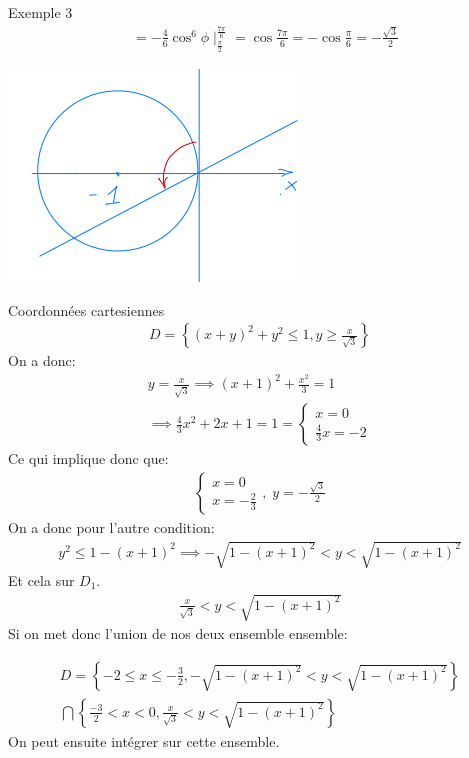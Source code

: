 \begin{parag}{Exemple 3}
\begin{align*}
                       &= - \frac{4}{6}\cos^6 \phi \mid_{\frac{\pi}{2}}^{\frac{7\pi}{6}} =  \cos \frac{7\pi}{6} =  -\cos \frac{\pi}{6} =  -\frac{\sqrt{3}}{2}
\end{align*}
\begin{center}
    \includegraphics[]{52025-05-21.png}
\end{center}
\begin{subparag}{Coordonnées cartesiennes}
    \begin{align*} 
        D =  \left\{\left(x + y\right)^2  + y^2 \leq 1, y \geq \frac{x}{\sqrt{3}} \right\}
    \end{align*}
    On a donc:
    \begin{align*} 
        y =  \frac{x}{\sqrt{3}} \implies \left(x + 1\right)^2 + \frac{x^2}{3} =  1 \\
        \implies \frac{4}{3}x^2 + 2x + 1 =  1 = \begin{cases} x =  0 \\ \frac{4}{3}x =  -2 \end{cases}
    \end{align*}
    Ce qui implique donc que:
    \begin{align*} 
         \begin{cases}
             x =  0\\ x = -\frac{2}{3}
         \end{cases} , \; y =  - \frac{\sqrt{3}}{2}
    \end{align*}
    On a donc pour l'autre condition:
    \begin{align*} 
        y^2 \leq 1 - \left(x + 1\right)^2 \implies -\sqrt{1 - \left(x + 1\right)^2} <y< \sqrt{1 - \left(x + 1\right)^2}
    \end{align*}
    Et cela sur $D_1$.
    \begin{align*} 
        \frac{x}{\sqrt{3}} < y < \sqrt{1 - \left(x + 1\right)^2}
    \end{align*}
    Si on met donc l'union de nos deux ensemble ensemble:

    \begin{align*} 
    D =  \left\{-2 \leq x \leq -\frac{3}{2}, - \sqrt{1 - \left(x + 1\right)^2} < y < \sqrt{1 - \left(x + 1\right)^2}\right\}\\
    \bigcap \left\{\frac{-3}{2}<x<0, \frac{x}{\sqrt{3}} < y < \sqrt{1 - \left(x + 1\right)^2}\right\}
    \end{align*}
    On peut ensuite intégrer sur cette ensemble.
\end{subparag}
\end{parag}

